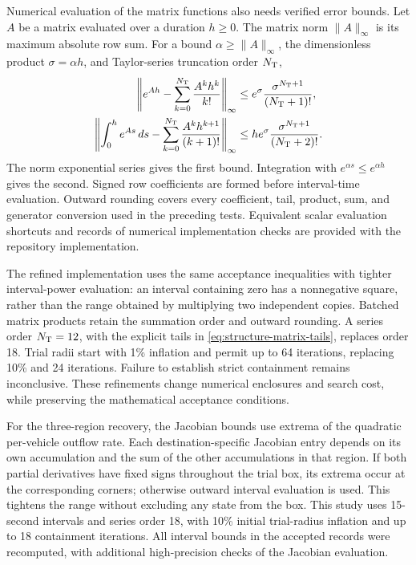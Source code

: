 \documentclass[final]{cas-sc}
\theoremstyle{definition}
\theoremstyle{plain}
\theoremstyle{definition}
\theoremstyle{plain}
\begin{document}
Numerical evaluation of the matrix functions also needs verified error
bounds. Let $A$ be a matrix evaluated over a duration $h\ge0$.
The matrix norm $\|A\|_\infty$ is its maximum absolute row sum.
For a bound $\alpha\ge\|A\|_\infty$, the dimensionless product
$\sigma=\alpha h$, and Taylor-series truncation order $N_{\rm T}$,
\begin{equation}
 \begin{aligned}
 \left\|e^{Ah}-\sum_{k=0}^{N_{\rm T}}\frac{A^kh^k}{k!}\right\|_\infty
       &\le e^\sigma\frac{\sigma^{N_{\rm T}+1}}{(N_{\rm T}+1)!},\\
 \left\|\int_0^h e^{As}\,ds-
          \sum_{k=0}^{N_{\rm T}}\frac{A^kh^{k+1}}{(k+1)!}\right\|_\infty
       &\le he^\sigma\frac{\sigma^{N_{\rm T}+1}}{(N_{\rm T}+2)!}.
 \end{aligned}
 \label{eq:structure-matrix-tails}
\end{equation}
The norm exponential series gives the first bound. Integration with
$e^{\alpha s}\le e^{\alpha h}$ gives the second. Signed row coefficients
are formed before interval-time evaluation. Outward rounding covers every
coefficient, tail, product, sum, and generator conversion used in the
preceding tests. Equivalent scalar evaluation shortcuts and records of numerical
implementation checks are provided with the repository implementation.

The refined implementation uses the same acceptance inequalities with
tighter interval-power evaluation: an interval containing zero has a
nonnegative square, rather than the range obtained by multiplying two
independent copies. Batched matrix products retain the summation order
and outward rounding. A series order $N_{\rm T}=12$, with the explicit
tails in \eqref{eq:structure-matrix-tails}, replaces order 18. Trial
radii start with 1\% inflation and permit up to 64 iterations, replacing
10\% and 24 iterations. Failure to establish strict containment remains
inconclusive. These refinements change numerical enclosures and search
cost, while preserving the mathematical acceptance conditions.

For the three-region recovery, the Jacobian bounds use extrema of the
quadratic per-vehicle outflow rate. Each destination-specific Jacobian
entry depends on its own accumulation and the sum of the other
accumulations in that region. If both partial derivatives have fixed
signs throughout the trial box, its extrema occur at the corresponding
corners; otherwise outward interval evaluation is used. This tightens
the range without excluding any state from the box. This study uses
15-second intervals and series order 18, with 10\% initial trial-radius
inflation and up to 18 containment iterations. All interval bounds in
the accepted records were recomputed,
with additional high-precision checks of the Jacobian evaluation.
\end{document}
